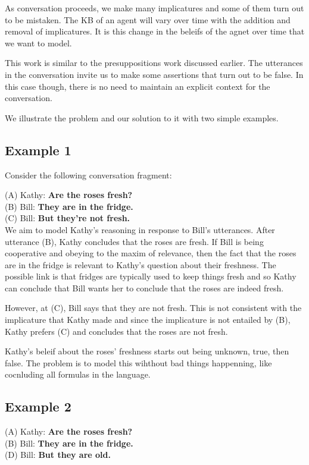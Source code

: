 \documentclass{article}
\begin{document}
As conversation proceeds, we make many implicatures and some of them
turn out to be mistaken. The KB of an agent will vary over time with
the addition and removal of implicatures. It is this change in the
beleifs of the agnet over time that we want to model.

This work is similar to the presuppositions work discussed
earlier. The utterances in the conversation invite us to make some
assertions that turn out to be false. In this case though, there is no
need to maintain an explicit context for the conversation.


We illustrate the problem and our solution to it with two simple examples.

\subsection{Example 1}

Consider the following conversation fragment:

\noindent
(A)     Kathy: {\bf Are the roses fresh?}\\
\noindent
(B)     Bill: {\bf They are in the fridge.}\\
\noindent
(C)     Bill: {\bf But they're not fresh.}\\

We aim to model Kathy's reasoning in response to Bill's
utterances. After utterance (B), Kathy concludes that the roses are
fresh. If Bill is being cooperative and obeying to the maxim of
relevance, then the fact that the roses are in the fridge is relevant
to Kathy's question about their freshness. The possible link is that
fridges are typically used to keep things fresh and so Kathy can
conclude that Bill wants her to conclude that the roses are indeed
fresh. 

However, at (C), Bill says that they are not fresh. This is not
consistent with the implicature that Kathy made and since the
implicature is not entailed by (B), Kathy prefers (C) and concludes
that the roses are not fresh.

Kathy's beleif about the roses' freshness starts out being unknown,
true, then false. The problem is to model this wihthout bad things
happenning, like cocnluding all formulas in the language.


\subsection{Example 2}

\noindent
(A)     Kathy: {\bf Are the roses fresh?}\\
\noindent
(B)     Bill: {\bf They are in the fridge.}\\
\noindent
(D)     Bill: {\bf But they are old.}\\
\end{document}
